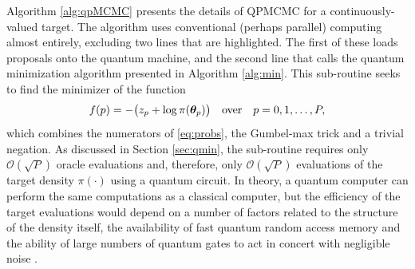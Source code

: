 \documentclass[12pt]{article} %
\begin{document}
Algorithm \ref{alg:qpMCMC} presents the details of QPMCMC for a continuously-valued target.  The algorithm uses conventional (perhaps parallel) computing almost entirely, excluding two lines that are highlighted.  The first of these loads proposals onto the quantum machine, and the second line that calls the quantum minimization algorithm presented in Algorithm \ref{alg:min}. 
This sub-routine seeks to find the minimizer of the function
\begin{align}\label{eq:objective}
f(p)= -\big(z_{p}+ \log\pi(\boldsymbol{\theta}_{p}) \big) \quad \mbox{over} \quad p=0,1,\dots, P,
\end{align} 
which combines the numerators of \eqref{eq:probs}, the Gumbel-max trick and a trivial negation.  As discussed in Section \ref{sec:qmin}, the sub-routine requires only $\mathcal{O}(\sqrt{P})$ oracle evaluations and, therefore, only $\mathcal{O}(\sqrt{P})$ evaluations of the target density $\pi(\cdot)$ using a quantum circuit.  In theory, a quantum computer can perform the same computations as a classical computer, but the efficiency of the target evaluations would depend on a number of factors related to the structure of the density itself, the availability of fast quantum random access memory \citep{giovannetti2008quantum} and the ability of large numbers of quantum gates to act in concert with negligible noise \citep{kielpinski2002architecture,erhard2019characterizing}.
\end{document}
